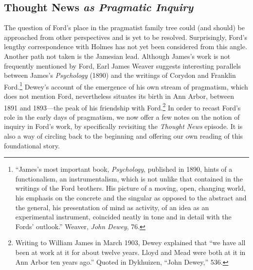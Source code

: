 \documentclass[twoside,symmetric,nobib,justified]{tufte-book}
\begin{document}
\hypertarget{thought-news-as-pragmatic-inquiry}{%
\subsection{\texorpdfstring{Thought News \emph{as Pragmatic
Inquiry}}{Thought News as Pragmatic Inquiry}}\label{thought-news-as-pragmatic-inquiry}}

The question of Ford's place in the pragmatist family tree could (and
should) be approached from other perspectives and is yet to be resolved.
Surprisingly, Ford's lengthy correspondence with Holmes has not yet been
considered from this angle. Another path not taken is the Jamesian lead.
Although James's work is not frequently mentioned by Ford, Earl James
Weaver suggests interesting parallels between James's \emph{Psychology}
(1890) and the writings of Corydon and Franklin Ford.\footnote{``James's
  most important book, \emph{Psychology}, published in 1890, hints of a
  functionalism, an instrumentalism, which is not unlike that contained
  in the writings of the Ford brothers. His picture of a moving, open,
  changing world, his emphasis on the concrete and the singular as
  opposed to the abstract and the general, his presentation of mind as
  activity, of an idea as an experimental instrument, coincided neatly
  in tone and in detail with the Fords' outlook.'' Weaver, \emph{John
  Dewey}, 76.} Dewey's account of the emergence of his own stream of
pragmatism, which does not mention Ford, nevertheless situates its birth
in Ann Arbor, between 1891 and 1893---the peak of his friendship with
Ford.\footnote{Writing to William James in March 1903, Dewey explained
  that ``we have all been at work at it for about twelve years. Lloyd
  and Mead were both at it in Ann Arbor ten years ago.'' Quoted in
  Dykhuizen, ``John Dewey,'' 536.} In order to recast Ford's role in the
early days of pragmatism, we now offer a few notes on the notion of
inquiry in Ford's work, by specifically revisiting the \emph{Thought
News} episode. It is also a way of circling back to the beginning and
offering our own reading of this foundational story.
\end{document}
